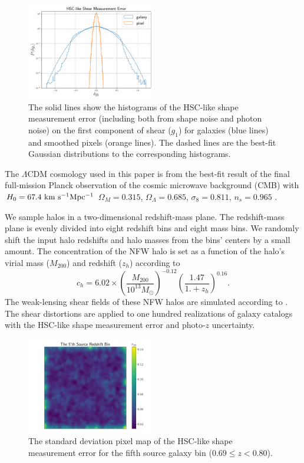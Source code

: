 \begin{figure}
 \centering
 \includegraphics[width=0.5\textwidth]{shapeMeasurementError-HSCY1.pdf}
 \caption{The solid lines show the histograms of the HSC-like shape measurement
     error (including both from shape noise and photon noise) on the first
     component of shear ($g_1$) for galaxies (blue lines) and smoothed pixels
     (orange lines). The dashed lines are the best-fit Gaussian distributions
     to the corresponding histograms.
    }
 \label{fig_noiseHistogram}
\end{figure}

The $\Lambda$CDM cosmology used in this paper is from the best-fit result of
the final full-mission Planck observation of the cosmic microwave background
(CMB) with $H_0=67.4 ~\rm{km~s^{-1} Mpc^{-1}}$ $\Omega_M=0.315$,
$\Omega_\Lambda=0.685$, $\sigma_8=0.811$, $n_s=0.965$
\citep{cmb-Planck2018-Cosmology}.

We sample halos in a two-dimensional redshift-mass plane. The redshift-mass
plane is evenly divided into eight redshift bins and eight mass bins. We
randomly shift the input halo redshifts and halo masses from the bins' centers
by a small amount. The concentration of the NFW halo is set as a function of
the halo's virial mass ($M_{200}$) and redshift ($z_{h}$) according to
\citet{c-M_Magneticum-Ragagnin2019}
\begin{equation}
c_{h}=6.02\times\left(\frac{M_{200}}{10^{13} M_{\odot}}\right)^{-0.12}
\left(\frac{1.47}{1.+z_h}\right)^{0.16}.
\end{equation}
The weak-lensing shear fields of these NFW halos are simulated according to
\citet{haloModel-TJ2003-3pt}. The shear distortions are applied to one hundred
realizations of galaxy catalogs with the HSC-like shape measurement error and
photo-$z$ uncertainty.

\begin{figure}
 \centering
 \includegraphics[width=0.5\textwidth]{noise_std_map_pix.pdf}
 \caption{The standard deviation pixel map of the HSC-like shape measurement
     error for the fifth source galaxy bin ($0.69 \leq z < 0.80 $).
        } \label{fig_noistdmap}
\end{figure}

